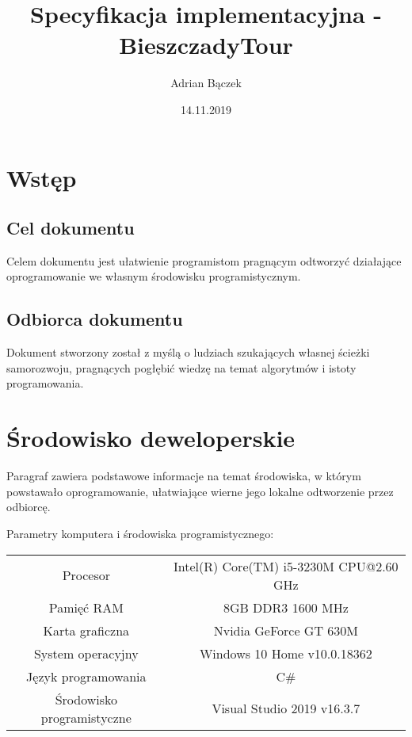 \documentclass[10pt,oneside]{article}
\title{Specyfikacja implementacyjna - BieszczadyTour}
\author{Adrian Bączek}
\date{14.11.2019}
\begin{document}
\maketitle


\thispagestyle{fancy}

\newpage


\section{Wstęp}
\subsection{Cel dokumentu}
Celem dokumentu jest ułatwienie programistom pragnącym odtworzyć działające oprogramowanie we własnym środowisku programistycznym.
\subsection{Odbiorca dokumentu}
Dokument stworzony został z myślą o ludziach szukających własnej ścieżki samorozwoju, pragnących pogłębić wiedzę na temat algorytmów i istoty programowania. 

\section{Środowisko deweloperskie}
Paragraf zawiera podstawowe informacje na temat środowiska, w którym powstawało oprogramowanie, ułatwiające wierne jego lokalne odtworzenie przez odbiorcę.
\begin{center}
Parametry komputera i środowiska programistycznego:
\newline \newline
\begin{tabular}{|c|c|} \hline
	Procesor & Intel(R) Core(TM) i5-3230M CPU@2.60 GHz
	\\[10pt] Pamięć RAM & 8GB DDR3 1600 MHz
	\\[10pt] Karta graficzna & Nvidia GeForce GT 630M
	\\[10pt] System operacyjny & Windows 10 Home v10.0.18362
	\\[10pt] Język programowania & C\#
	\\[10pt] Środowisko programistyczne & Visual Studio 2019 v16.3.7 \\ \hline
\end{tabular}
\end{center}
\end{document}
